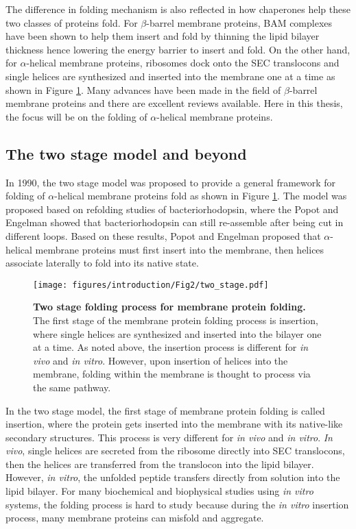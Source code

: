 The difference in folding mechanism is also reflected in how chaperones help these two classes of proteins fold. For $\beta$-barrel membrane proteins, BAM complexes have been shown to help them insert and fold by thinning the lipid bilayer thickness hence lowering the energy barrier to insert and fold. \cite{gessmann2014, plummer2016} On the other hand, for $\alpha$-helical membrane proteins, ribosomes dock onto the SEC translocons and single helices are synthesized and inserted into the membrane one at a time as shown in Figure \ref{fig:intro_f2}. Many advances have been made in the field of $\beta$-barrel membrane proteins and there are excellent reviews available. Here in this thesis, the focus will be on the folding of $\alpha$-helical membrane proteins.

\subsection{The two stage model and beyond}
In 1990, the two stage model was proposed to provide a general framework for folding of $\alpha$-helical membrane proteins fold as shown in Figure \ref{fig:intro_f2}. The model was proposed based on refolding studies of bacteriorhodopsin, where the Popot and Engelman showed that bacteriorhodopsin can still re-assemble after being cut in different loops. Based on these results, Popot and Engelman proposed that $\alpha$-helical membrane proteins must first insert into the membrane, then helices associate laterally to fold into its native state.

\begin{figure}[!ht]
\begin{center}
	\texttt{[image: figures/introduction/Fig2/two\_stage.pdf]}
\end{center}
	\caption{\textbf{Two stage folding process for membrane protein folding.} The first stage of the membrane protein folding process is insertion, where single helices are synthesized and inserted into the bilayer one at a time. As noted above, the insertion process is different for \textit{in vivo} and \textit{in vitro}. However, upon insertion of helices into the membrane, folding within the membrane is thought to process via the same pathway.}
	\label{fig:intro_f2}
\end{figure}

In the two stage model, the first stage of membrane protein folding is called insertion, where the protein gets inserted into the membrane with its native-like secondary structures. This process is very different for \textit{in vivo} and \textit{in vitro}. \textit{In vivo}, single helices are secreted from the ribosome directly into SEC translocons, then the helices are transferred from the translocon into the lipid bilayer. However, \textit{in vitro}, the unfolded peptide transfers directly from solution into the lipid bilayer. For many biochemical and biophysical studies using \textit{in vitro} systems, the folding process is hard to study because during the \textit{in vitro} insertion process, many membrane proteins can misfold and aggregate.

